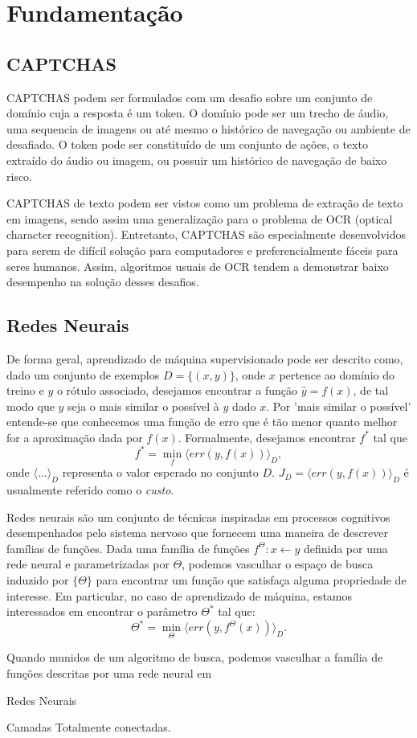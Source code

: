 \chapter{Fundamentação}

\section{CAPTCHAS}

CAPTCHAS podem ser formulados com um desafio sobre um conjunto de domínio cuja a resposta é um token. O domínio pode ser um trecho de áudio, uma sequencia de imagens ou até mesmo o histórico de navegação ou ambiente de desafiado. O token pode ser constituído de um conjunto de ações, o texto extraído do áudio ou imagem, ou possuir um histórico de navegação de baixo risco.

CAPTCHAS de texto podem ser vistos como um problema de extração de texto em imagens, sendo assim uma generalização para o problema de OCR (optical character recognition). Entretanto, CAPTCHAS são especialmente desenvolvidos para serem de difícil solução para computadores e preferencialmente fáceis para seres humanos. Assim, algoritmos usuais de OCR tendem a demonstrar baixo desempenho na solução desses desafios.



\section{Redes Neurais}

De forma geral, aprendizado de máquina supervisionado pode ser descrito como, dado um conjunto de exemplos $D = \{(x, y)\}$, onde $x$  pertence ao domínio do treino e $y$ o rótulo associado, desejamos encontrar a função $\hat{y} = f(x)$, de tal modo que $\hat{y}$ seja o mais similar o possível à $y$ dado $x$. Por 'mais similar o possível' entende-se que conhecemos uma função de erro que é tão menor quanto melhor for a aproximação dada por $f(x)$. Formalmente, desejamos encontrar $f^*$ tal que
\begin{equation}
f^* = \min_f \langle err(y, f(x)) \rangle_{D},
\end{equation}   
onde $\langle \ldots \rangle_{D}$ representa o valor esperado no conjunto $D$. $J_D = \langle err(y, f(x)) \rangle_{D}$ é usualmente referido como o \textit{custo}.

Redes neurais são um conjunto de técnicas inspiradas em processos cognitivos desempenhados pelo sistema nervoso que fornecem uma maneira de descrever famílias de funções. Dada uma família de funções $f^{\Theta} : x \leftarrow y$ definida por uma rede neural e parametrizadas por $\Theta$, podemos vasculhar o espaço de busca induzido por $\{\Theta\}$ para encontrar um função que satisfaça alguma propriedade de interesse. Em particular, no caso de aprendizado de máquina, estamos interessados em encontrar o parâmetro $\Theta^*$ tal que:
\begin{equation}
\Theta^* = \min_{\Theta} \langle err(y, f^{\Theta}(x)) \rangle_{D}.
\end{equation} 




Quando munidos de um algoritmo de busca, podemos vasculhar a família de funções descritas por uma rede neural em 

Redes Neurais 



Camadas Totalmente conectadas. 





